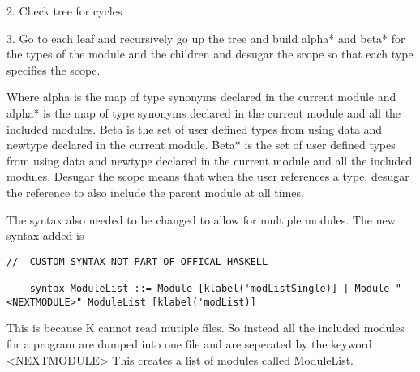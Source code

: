 2. Check tree for cycles

3. Go to each leaf and recursively go up the tree and build alpha* and beta* for the types of the module and the children and desugar the scope so that each type specifies the scope.

Where alpha is the map of type synonyms declared in the current module and alpha* is the map of type synonyms declared in the current module and all the included modules. Beta is the set of user defined types from using data and newtype declared in the current module. Beta* is the set of user defined types from using data and newtype declared in the current module and all the included modules. 
Desugar the scope means that when the user references a type, desugar the reference to also include the parent module at all times.

The syntax also needed to be changed to allow for multiple modules. The new syntax added is

\begin{lstlisting}
//  CUSTOM SYNTAX NOT PART OF OFFICAL HASKELL

    syntax ModuleList ::= Module [klabel('modListSingle)] | Module "<NEXTMODULE>" ModuleList [klabel('modList)]
\end{lstlisting}

This is because K cannot read mutiple files. So instead all the included modules for a program are dumped into one file and are seperated by the keyword <NEXTMODULE>
This creates a list of modules called ModuleList.

